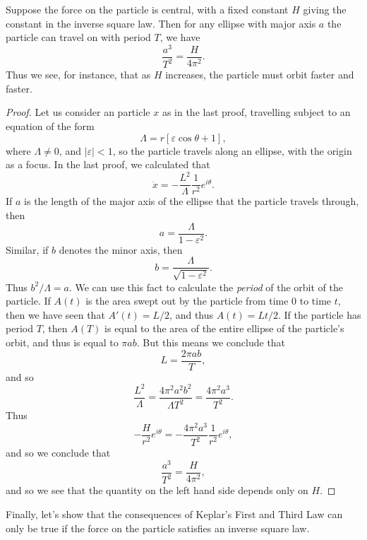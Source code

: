 \begin{theorem}
    Suppose the force on the particle is central, with a fixed constant $H$ giving the constant in the inverse square law. Then for any ellipse with major axis $a$ the particle can travel on with period $T$, we have
    \[ \frac{a^3}{T^2} = \frac{H}{4 \pi^2}. \]
    Thus we see, for instance, that as $H$ increases, the particle must orbit faster and faster.
\end{theorem}
\begin{proof}
    Let us consider an particle $x$ as in the last proof, travelling subject to an equation of the form
    \[ \Lambda = r [ \varepsilon \cos \theta + 1 ], \]
    where $\Lambda \neq 0$, and $|\varepsilon| < 1$, so the particle travels along an ellipse, with the origin as a focus. In the last proof, we calculated that
    \[ \ddot{x} = - \frac{L^2}{\Lambda} \frac{1}{r^2} e^{i \theta}. \]
    If $a$ is the length of the major axis of the ellipse that the particle travels through, then
    \[ a = \frac{\Lambda}{1 - \varepsilon^2}. \]
    Similar, if $b$ denotes the minor axis, then
    \[ b = \frac{\Lambda}{\sqrt{1 - \varepsilon^2}}. \]
    Thus $b^2 / \Lambda = a$. We can use this fact to calculate the \emph{period} of the orbit of the particle. If $A(t)$ is the area swept out by the particle from time $0$ to time $t$, then we have seen that $A'(t) = L / 2$, and thus $A(t) = Lt/2$. If the particle has period $T$, then $A(T)$ is equal to the area of the entire ellipse of the particle's orbit, and thus is equal to $\pi a b$. But this means we conclude that
    \[ L = \frac{2 \pi a b}{T}, \]
    and so
    \[ \frac{L^2}{\Lambda} = \frac{4 \pi^2 a^2 b^2}{\Lambda T^2} = \frac{4 \pi^2 a^3}{T^2}. \]
    Thus
    \[ - \frac{H}{r^2} e^{i \theta} = - \frac{4 \pi^2 a^3}{T^2} \frac{1}{r^2} e^{i \theta}, \]
    and so we conclude that
    \[ \frac{a^3}{T^2} = \frac{H}{4 \pi^2}, \]
    and so we see that the quantity on the left hand side depends only on $H$.
\end{proof}

Finally, let's show that the consequences of Keplar's First and Third Law can only be true if the force on the particle satisfies an inverse square law.

